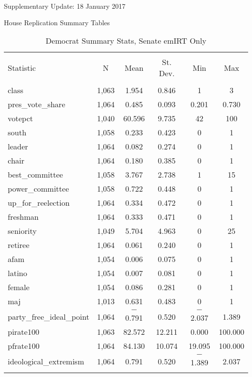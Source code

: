 \documentclass[12pt]{article}
\begin{document}
\begin{center}
Supplementary Update: 18 January 2017

House Replication
Summary Tables
\end{center}

\begin{table}[!htbp] \centering 
	\caption{Democrat Summary Stats, Senate emIRT Only} 
	\label{} 
	\begin{tabular}{@{\extracolsep{5pt}}lccccc} 
		\\[-1.8ex]\hline 
		\hline \\[-1.8ex] 
		Statistic & \multicolumn{1}{c}{N} & \multicolumn{1}{c}{Mean} & \multicolumn{1}{c}{St. Dev.} & \multicolumn{1}{c}{Min} & \multicolumn{1}{c}{Max} \\ 
		\hline \\[-1.8ex] 
		class & 1,063 & 1.954 & 0.846 & 1 & 3 \\ 
		pres\_vote\_share & 1,064 & 0.485 & 0.093 & 0.201 & 0.730 \\ 
		votepct & 1,040 & 60.596 & 9.735 & 42 & 100 \\ 
		south & 1,058 & 0.233 & 0.423 & 0 & 1 \\ 
		leader & 1,064 & 0.082 & 0.274 & 0 & 1 \\ 
		chair & 1,064 & 0.180 & 0.385 & 0 & 1 \\ 
		best\_committee & 1,058 & 3.767 & 2.738 & 1 & 15 \\ 
		power\_committee & 1,058 & 0.722 & 0.448 & 0 & 1 \\ 
		up\_for\_reelection & 1,064 & 0.334 & 0.472 & 0 & 1 \\ 
		freshman & 1,064 & 0.333 & 0.471 & 0 & 1 \\ 
		seniority & 1,049 & 5.704 & 4.963 & 0 & 25 \\ 
		retiree & 1,064 & 0.061 & 0.240 & 0 & 1 \\ 
		afam & 1,054 & 0.006 & 0.075 & 0 & 1 \\ 
		latino & 1,054 & 0.007 & 0.081 & 0 & 1 \\ 
		female & 1,054 & 0.086 & 0.281 & 0 & 1 \\ 
		maj & 1,013 & 0.631 & 0.483 & 0 & 1 \\ 
		party\_free\_ideal\_point & 1,064 & $-$0.791 & 0.520 & $-$2.037 & 1.389 \\ 
		pirate100 & 1,063 & 82.572 & 12.211 & 0.000 & 100.000 \\ 
		pfrate100 & 1,064 & 84.130 & 10.074 & 19.095 & 100.000 \\ 
		ideological\_extremism & 1,064 & 0.791 & 0.520 & $-$1.389 & 2.037 \\ 
		\hline \\[-1.8ex] 
	\end{tabular} 
\end{table}
\end{document}

